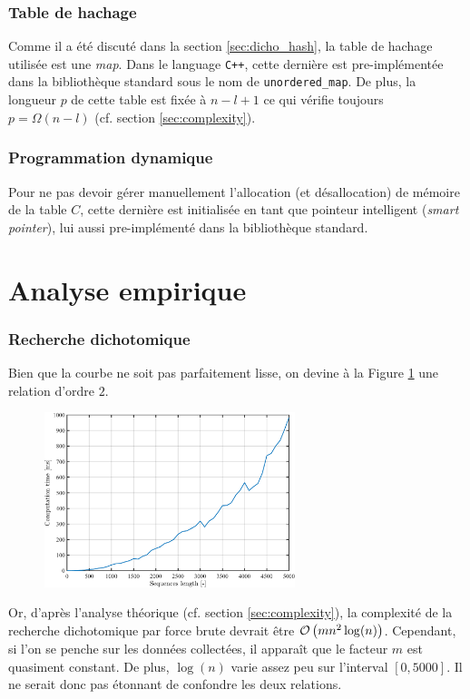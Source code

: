 \documentclass[a4paper, 12pt]{article}
\begin{document}
	\subsubsection*{Table de hachage}
	Comme il a été discuté dans la section \ref{sec:dicho_hash}, la table de hachage utilisée est une \emph{map}. Dans le language \texttt{C++}, cette dernière est pre-implémentée dans la bibliothèque standard sous le nom de \texttt{unordered\_map}. De plus, la longueur $p$ de cette table est fixée à $n - l + 1$ ce qui vérifie toujours $p = \Omega(n - l)$ (cf. section \ref{sec:complexity}).
	\subsubsection*{Programmation dynamique}
	Pour ne pas devoir gérer manuellement l'allocation (et désallocation) de mémoire de la table $C$, cette dernière est initialisée en tant que pointeur intelligent (\emph{smart pointer}), lui aussi pre-implémenté dans la bibliothèque standard.
	\newpage
	\section{Analyse empirique}
	\subsubsection*{Recherche dichotomique}
	Bien que la courbe ne soit pas parfaitement lisse, on devine à la Figure \ref{fig:dichotomic} une relation d'ordre $2$.
	\begin{figure}[H]
		\centering
		\includegraphics[width=0.65\textwidth]{resources/pdf/dichotomic.pdf}
		\label{fig:dichotomic}
	\end{figure}
	Or, d'après l'analyse théorique (cf. section \ref{sec:complexity}), la complexité de la recherche dichotomique par force brute devrait être $\mathcal{O}\left(m n^2 \log(n)\right)$. Cependant, si l'on se penche sur les données collectées, il apparaît que le facteur $m$ est quasiment constant. De plus, $\log(n)$ varie assez peu sur l'interval $[0, 5000]$. Il ne serait donc pas étonnant de confondre les deux relations.
\end{document}
